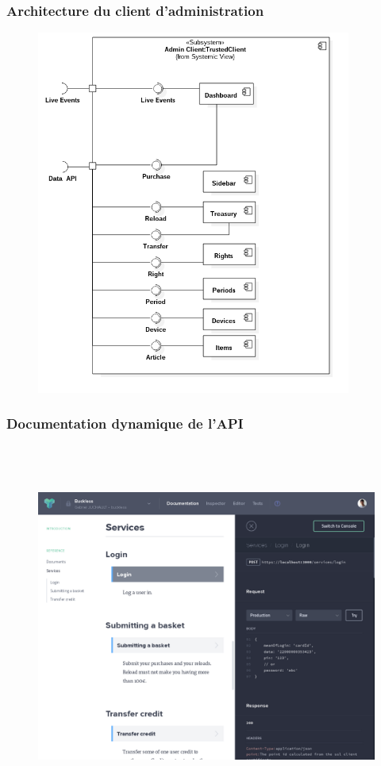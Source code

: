     \newpage
    \subsubsection{Architecture du client d'administration}
        \begin{figure}[h]
            \centering
            \includegraphics[height=12cm]{./assets/UML/admin_client.png}
        \end{figure}

    \newpage
    \subsubsection{Documentation dynamique de l'API}
        \begin{figure}[h]
            \centering
            \includegraphics[height=12cm]{./assets/apiary.png}
        \end{figure}